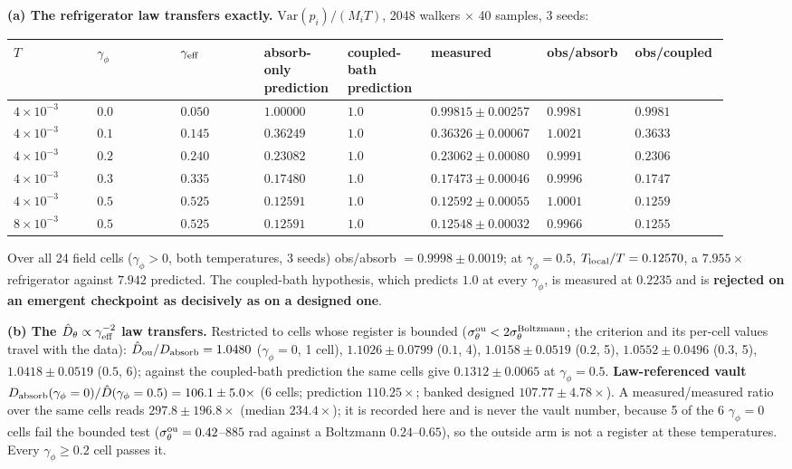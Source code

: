 \documentclass{article}
\begin{document}
\textbf{(a) The refrigerator law transfers exactly.} $\mathrm{Var}(p_i)/(M_iT)$, 2048 walkers $\times$ 40 samples, 3 seeds:

\begin{table}[t]\centering\small
\begin{tabular}{p{0.115\linewidth}p{0.115\linewidth}p{0.115\linewidth}p{0.115\linewidth}p{0.115\linewidth}p{0.115\linewidth}p{0.115\linewidth}p{0.115\linewidth}}
\toprule
$T$ & $\gamma_\phi$ & $\gamma_{\rm eff}$ & absorb-only prediction & coupled-bath prediction & measured & obs/absorb & obs/coupled \\
\midrule
$4\times10^{-3}$ & $0.0$ & $0.050$ & $1.00000$ & $1.0$ & $0.99815\pm0.00257$ & $0.9981$ & $0.9981$ \\
$4\times10^{-3}$ & $0.1$ & $0.145$ & $0.36249$ & $1.0$ & $0.36326\pm0.00067$ & $1.0021$ & $0.3633$ \\
$4\times10^{-3}$ & $0.2$ & $0.240$ & $0.23082$ & $1.0$ & $0.23062\pm0.00080$ & $0.9991$ & $0.2306$ \\
$4\times10^{-3}$ & $0.3$ & $0.335$ & $0.17480$ & $1.0$ & $0.17473\pm0.00046$ & $0.9996$ & $0.1747$ \\
$4\times10^{-3}$ & $0.5$ & $0.525$ & $0.12591$ & $1.0$ & $0.12592\pm0.00055$ & $1.0001$ & $0.1259$ \\
$8\times10^{-3}$ & $0.5$ & $0.525$ & $0.12591$ & $1.0$ & $0.12548\pm0.00032$ & $0.9966$ & $0.1255$ \\
\bottomrule
\end{tabular}
\end{table}

Over all 24 field cells ($\gamma_\phi>0$, both temperatures, 3 seeds) obs/absorb $=0.9998\pm0.0019$; at $\gamma_\phi=0.5$, $T_{\rm local}/T=0.12570$, a $7.955\times$ refrigerator against $7.942$ predicted. The coupled-bath hypothesis, which predicts $1.0$ at every $\gamma_\phi$, is measured at $0.2235$ and is \textbf{rejected on an emergent checkpoint as decisively as on a designed one}.

\textbf{(b) The $\hat D_\theta\propto\gamma_{\rm eff}^{-2}$ law transfers.} Restricted to cells whose register is bounded ($\sigma^{\rm ou}_\theta<2\sigma^{\rm Boltzmann}_\theta$; the criterion and its per-cell values travel with the data): $\hat D_{\rm ou}/D_{\rm absorb}=1.0480$ ($\gamma_\phi=0$, 1 cell), $1.1026\pm0.0799$ ($0.1$, 4), $1.0158\pm0.0519$ ($0.2$, 5), $1.0552\pm0.0496$ ($0.3$, 5), $1.0418\pm0.0519$ ($0.5$, 6); against the coupled-bath prediction the same cells give $0.1312\pm0.0065$ at $\gamma_\phi=0.5$. \textbf{Law-referenced vault $D_{\rm absorb}(\gamma_\phi=0)/\hat D(\gamma_\phi=0.5)=106.1\pm5.0\times$} (6 cells; prediction $110.25\times$; banked designed $107.77\pm4.78\times$). A measured/measured ratio over the same cells reads $297.8\pm196.8\times$ (median $234.4\times$); it is recorded here and is never the vault number, because 5 of the 6 $\gamma_\phi=0$ cells fail the bounded test ($\sigma^{\rm ou}_\theta=0.42$--$885$ rad against a Boltzmann $0.24$--$0.65$), so the outside arm is not a register at these temperatures. Every $\gamma_\phi\ge0.2$ cell passes it.
\end{document}
